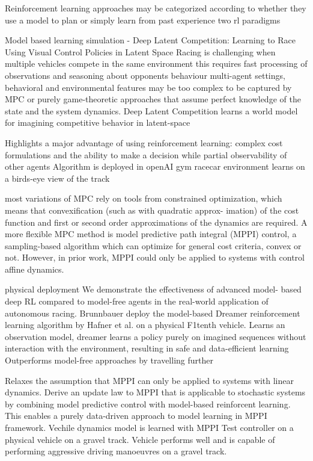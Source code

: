 Reinforcement learning approaches may be categorized according to whether they use a model to plan or simply learn from past experience
two rl paradigms

Model based learning
simulation
\cite{Schwarting2021} - Deep Latent Competition: Learning to Race Using Visual Control Policies in Latent Space
Racing is challenging when multiple vehicles compete in the same environment
this requires fast processing of observations and seasoning about opponents behaviour
multi-agent settings, behavioral and environmental features may be too complex to be captured by MPC or purely game-theoretic approaches that assume perfect knowledge of the state and the system dynamics.
Deep Latent Competition learns a world model for imagining competitive behavior in latent-space

Highlights a major advantage of using reinforcement learning: complex cost formulations and the ability to make a decision while
partial observability of other agents
Algorithm is deployed in openAI gym racecar environment
learns on a birds-eye view of the track 

most variations of MPC rely on tools from constrained optimization, which means that convexification (such as with quadratic approx- imation) of the cost function and first or second order approximations of the dynamics are required.
A more flexible MPC method is model predictive path
integral (MPPI) control, a sampling-based algorithm which can optimize for general cost criteria, convex or not. However, in prior work, MPPI could only be applied to systems with control affine dynamics.

physical deployment
\cite{brunnbauer}
We demonstrate the effectiveness of advanced model- based deep RL compared to model-free agents in the real-world application of autonomous racing.
Brunnbauer deploy the model-based Dreamer reinforcement learning algorithm by Hafner et al. \cite{Hafner2019a} on a physical F1tenth vehicle.
Learns an observation model, dreamer learns a policy purely on imagined sequences without interaction with the environment, resulting in safe and data-efficient learning
Outperforms model-free approaches by travelling further

\cite{Williams2017}
Relaxes the assumption that MPPI can only be applied to systems with linear dynamics.
Derive an update law to MPPI that is applicable to stochastic systems
by combining  model predictive control with model-based reinforcent learning.
This enables a purely data-driven approach to model learning in MPPI framework.
Vechile dynamics model is learned with MPPI 
Test controller  on a physical vehicle on a gravel track.
Vehicle performs well and is capable of performing aggressive driving manoeuvres on a gravel track. 

